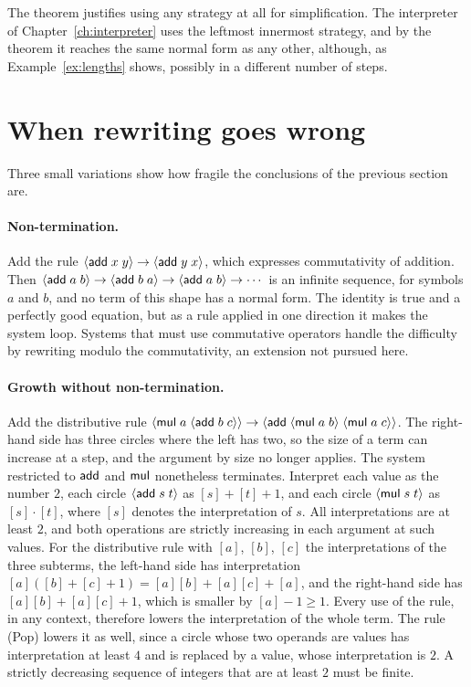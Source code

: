 The theorem justifies using any strategy at all for simplification. The interpreter of Chapter~\ref{ch:interpreter} uses the leftmost innermost strategy, and by the theorem it reaches the same normal form as any other, although, as Example~\ref{ex:lengths} shows, possibly in a different number of steps.

\section{When rewriting goes wrong}

Three small variations show how fragile the conclusions of the previous section are.

\paragraph{Non-termination.}
Add the rule $\langle \mathsf{add}\; x\; y\rangle\to\langle \mathsf{add}\; y\; x\rangle$, which expresses commutativity of addition. Then $\langle \mathsf{add}\; a\; b\rangle\to\langle \mathsf{add}\; b\; a\rangle\to\langle \mathsf{add}\; a\; b\rangle\to\cdots$ is an infinite sequence, for symbols $a$ and $b$, and no term of this shape has a normal form. The identity is true and a perfectly good equation, but as a rule applied in one direction it makes the system loop. Systems that must use commutative operators handle the difficulty by rewriting modulo the commutativity, an extension not pursued here.

\paragraph{Growth without non-termination.}
Add the distributive rule $\langle \mathsf{mul}\; a\; \langle \mathsf{add}\; b\; c\rangle\rangle\to\langle \mathsf{add}\; \langle \mathsf{mul}\; a\; b\rangle\; \langle \mathsf{mul}\; a\; c\rangle\rangle$. The right-hand side has three circles where the left has two, so the size of a term can increase at a step, and the argument by size no longer applies. The system restricted to $\mathsf{add}$ and $\mathsf{mul}$ nonetheless terminates. Interpret each value as the number $2$, each circle $\langle \mathsf{add}\; s\; t\rangle$ as $[s]+[t]+1$, and each circle $\langle \mathsf{mul}\; s\; t\rangle$ as $[s]\cdot[t]$, where $[s]$ denotes the interpretation of $s$. All interpretations are at least $2$, and both operations are strictly increasing in each argument at such values. For the distributive rule with $[a]$, $[b]$, $[c]$ the interpretations of the three subterms, the left-hand side has interpretation $[a]([b]+[c]+1)=[a][b]+[a][c]+[a]$, and the right-hand side has $[a][b]+[a][c]+1$, which is smaller by $[a]-1\ge1$. Every use of the rule, in any context, therefore lowers the interpretation of the whole term. The rule (Pop) lowers it as well, since a circle whose two operands are values has interpretation at least $4$ and is replaced by a value, whose interpretation is $2$. A strictly decreasing sequence of integers that are at least $2$ must be finite.


